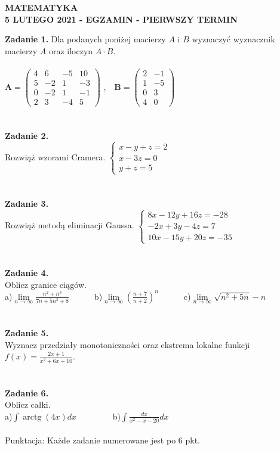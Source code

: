 \documentclass[12pt,a4paper]{report}
\begin{document}
\begin{center}

\textbf{MATEMATYKA \\5 LUTEGO 2021 - EGZAMIN - PIERWSZY TERMIN}

\end{center}\textbf{Zadanie 1.} Dla podanych poniżej macierzy $A$ i $B$ wyznaczyć wyznacznik macierzy $A$ oraz iloczyn $A\cdot B$. \\\\ $ \mathbf{A} = \left( \begin{array}{cccc} 4 & 6& -5 & 10\\5 & -2& 1 & -3\\0 & -2& 1 & -1\\2 & 3 & -4 & 5 \end{array} \right)$ ,\ \ $\mathbf{B} =\left( \begin{array}{cccc}2 & -1\\1 & -5\\0 & 3\\4 & 0  \end{array} \right)$\\\\\\\textbf{Zadanie 2.}  \\Rozwiąż wzorami Cramera. $\left\{ \begin{array}{ll}x-y+z=2\\x-3z=0\\y+z=5\end{array}\right.$\\\\\\\textbf{Zadanie 3.} \\Rozwiąż metodą eliminacji Gaussa. $\left\{ \begin{array}{ll}8x-12y+16z=-28\\-2x+3y-4z=7\\10x-15y+20z=-35\end{array} \right.$\\\\\\\textbf{Zadanie 4.} \\Oblicz granice ciągów.\\a)$\lim\limits_{n\to\infty}\frac{n^2+n^3}{7n+5n^3+8}$\ \ \ \ \ \  b)$\lim\limits_{n\to \infty}(\frac{n+7}{n+2})^n$\ \ \ \ \ \ c)$\lim\limits_{n\to\infty} \sqrt{n^2+5n}-n$\\\\\\\textbf{Zadanie 5.}\\Wyznacz przedziały monotoniczności oraz ekstrema lokalne funkcji $f(x)=\frac{2x+1}{x^2+6x+10}$.\\\\\\\textbf{Zadanie 6.} \\Oblicz całki. \\a)$\int \operatorname{arctg}(4x) dx$ \ \ \ \ \ \ \ \ b)$\int \frac{dx}{x^2-x-20} dx$\\\\Punktacja: Każde zadanie numerowane jest po 6 pkt.
\end{document}
